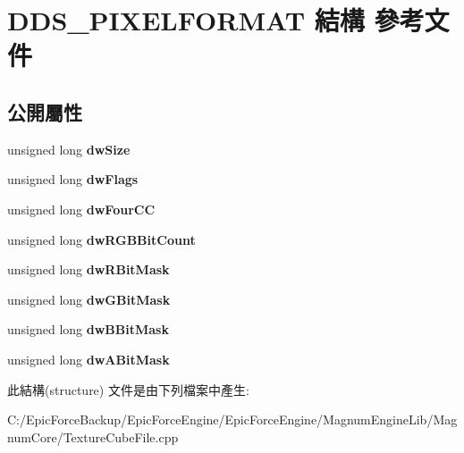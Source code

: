 \hypertarget{struct_d_d_s___p_i_x_e_l_f_o_r_m_a_t}{}\section{D\+D\+S\+\_\+\+P\+I\+X\+E\+L\+F\+O\+R\+M\+AT 結構 參考文件}
\label{struct_d_d_s___p_i_x_e_l_f_o_r_m_a_t}
\subsection*{公開屬性}
\begin{DoxyCompactItemize}
\item 
unsigned long {\bfseries dw\+Size}\hypertarget{struct_d_d_s___p_i_x_e_l_f_o_r_m_a_t_aa1993b5c6384e5beeafa17267b3727a9}{}\label{struct_d_d_s___p_i_x_e_l_f_o_r_m_a_t_aa1993b5c6384e5beeafa17267b3727a9}

\item 
unsigned long {\bfseries dw\+Flags}\hypertarget{struct_d_d_s___p_i_x_e_l_f_o_r_m_a_t_ad8a191bc252320dd5401905a616fab42}{}\label{struct_d_d_s___p_i_x_e_l_f_o_r_m_a_t_ad8a191bc252320dd5401905a616fab42}

\item 
unsigned long {\bfseries dw\+Four\+CC}\hypertarget{struct_d_d_s___p_i_x_e_l_f_o_r_m_a_t_a9cc44e3199d96d89eebb22ffdbe155ae}{}\label{struct_d_d_s___p_i_x_e_l_f_o_r_m_a_t_a9cc44e3199d96d89eebb22ffdbe155ae}

\item 
unsigned long {\bfseries dw\+R\+G\+B\+Bit\+Count}\hypertarget{struct_d_d_s___p_i_x_e_l_f_o_r_m_a_t_a6fe3b9fd3be46f4ee7bcd962438ae602}{}\label{struct_d_d_s___p_i_x_e_l_f_o_r_m_a_t_a6fe3b9fd3be46f4ee7bcd962438ae602}

\item 
unsigned long {\bfseries dw\+R\+Bit\+Mask}\hypertarget{struct_d_d_s___p_i_x_e_l_f_o_r_m_a_t_a8dfeb6ba5f0eb9239df31d237a56c64c}{}\label{struct_d_d_s___p_i_x_e_l_f_o_r_m_a_t_a8dfeb6ba5f0eb9239df31d237a56c64c}

\item 
unsigned long {\bfseries dw\+G\+Bit\+Mask}\hypertarget{struct_d_d_s___p_i_x_e_l_f_o_r_m_a_t_a038f618b87ea553e88ff6431ff8bbf8c}{}\label{struct_d_d_s___p_i_x_e_l_f_o_r_m_a_t_a038f618b87ea553e88ff6431ff8bbf8c}

\item 
unsigned long {\bfseries dw\+B\+Bit\+Mask}\hypertarget{struct_d_d_s___p_i_x_e_l_f_o_r_m_a_t_a5432ed5d72d96dd9512ad5c664ad41ba}{}\label{struct_d_d_s___p_i_x_e_l_f_o_r_m_a_t_a5432ed5d72d96dd9512ad5c664ad41ba}

\item 
unsigned long {\bfseries dw\+A\+Bit\+Mask}\hypertarget{struct_d_d_s___p_i_x_e_l_f_o_r_m_a_t_ae9a4852afa94c5828486ee0e1aa5f956}{}\label{struct_d_d_s___p_i_x_e_l_f_o_r_m_a_t_ae9a4852afa94c5828486ee0e1aa5f956}

\end{DoxyCompactItemize}


此結構(structure) 文件是由下列檔案中產生\+:\begin{DoxyCompactItemize}
\item 
C\+:/\+Epic\+Force\+Backup/\+Epic\+Force\+Engine/\+Epic\+Force\+Engine/\+Magnum\+Engine\+Lib/\+Magnum\+Core/Texture\+Cube\+File.\+cpp\end{DoxyCompactItemize}
